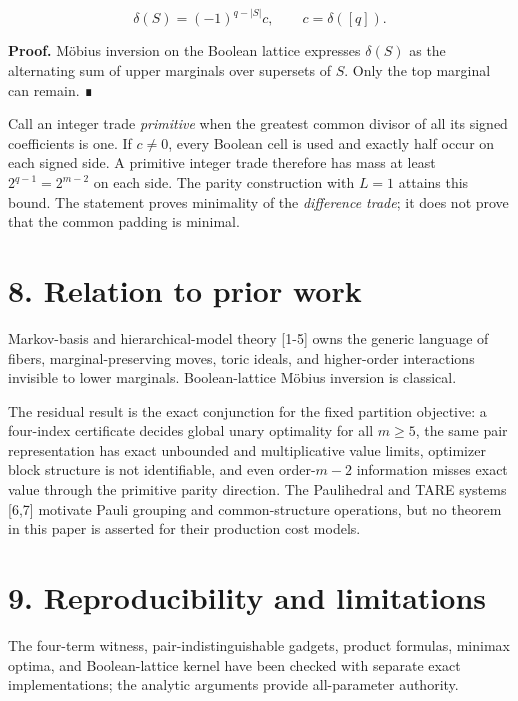 \documentclass[
  11pt,
]{article}
\begin{document}
\[
\delta(S)=(-1)^{q-|S|}c,
\qquad c=\delta([q]).
\]

\textbf{Proof.} Möbius inversion on the Boolean lattice expresses
\(\delta(S)\) as the alternating sum of upper marginals over supersets
of \(S\). Only the top marginal can remain. ∎

Call an integer trade \emph{primitive} when the greatest common divisor
of all its signed coefficients is one. If \(c\ne0\), every Boolean cell
is used and exactly half occur on each signed side. A primitive integer
trade therefore has mass at least \(2^{q-1}=2^{m-2}\) on each side. The
parity construction with \(L=1\) attains this bound. The statement
proves minimality of the \emph{difference trade}; it does not prove that
the common padding is minimal.

\hypertarget{relation-to-prior-work}{%
\section{8. Relation to prior work}\label{relation-to-prior-work}}

Markov-basis and hierarchical-model theory {[}1-5{]} owns the generic
language of fibers, marginal-preserving moves, toric ideals, and
higher-order interactions invisible to lower marginals. Boolean-lattice
Möbius inversion is classical.

The residual result is the exact conjunction for the fixed partition
objective: a four-index certificate decides global unary optimality for
all \(m\ge5\), the same pair representation has exact unbounded and
multiplicative value limits, optimizer block structure is not
identifiable, and even order-\(m-2\) information misses exact value
through the primitive parity direction. The Paulihedral and TARE systems
{[}6,7{]} motivate Pauli grouping and common-structure operations, but
no theorem in this paper is asserted for their production cost models.

\hypertarget{reproducibility-and-limitations}{%
\section{9. Reproducibility and
limitations}\label{reproducibility-and-limitations}}

The four-term witness, pair-indistinguishable gadgets, product formulas,
minimax optima, and Boolean-lattice kernel have been checked with
separate exact implementations; the analytic arguments provide
all-parameter authority.
\end{document}
